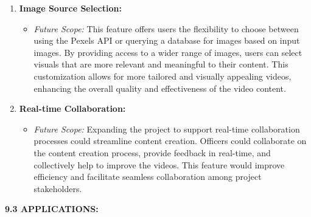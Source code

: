 \documentclass[12pt]{article}
\begin{document}
\begin{enumerate}[label=\arabic*.]
    \item \textbf{Image Source Selection:}
    \begin{itemize}
        \item \textit{Future Scope:} This feature offers users the flexibility to choose between using the Pexels API or querying a database for images based on input images. By providing access to a wider range of images, users can select visuals that are more relevant and meaningful to their content. This customization allows for more tailored and visually appealing videos, enhancing the overall quality and effectiveness of the video content.
    \end{itemize}

    \item \textbf{Real-time Collaboration:}
    \begin{itemize}
        \item \textit{Future Scope:} Expanding the project to support real-time collaboration processes could streamline content creation. Officers could collaborate on the content creation process, provide feedback in real-time, and collectively help to improve the videos. This feature would improve efficiency and facilitate seamless collaboration among project stakeholders.
    \end{itemize}
\end{enumerate}
\bigskip

\justify \textbf{9.3 APPLICATIONS:}
\end{document}
